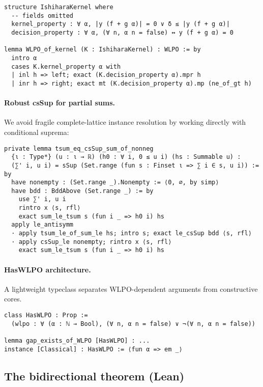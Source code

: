 \documentclass[11pt]{article}
\begin{document}
\begin{lstlisting}[caption={Ishihara kernel (illustrative Lean snippet)}]
structure IshiharaKernel where
  -- fields omitted
  kernel_property : ∀ α, |y (f + g α)| = 0 ∨ δ ≤ |y (f + g α)|
  decision_property : ∀ α, (∀ n, α n = false) ↔ y (f + g α) = 0

lemma WLPO_of_kernel (K : IshiharaKernel) : WLPO := by
  intro α
  cases K.kernel_property α with
  | inl h => left; exact (K.decision_property α).mpr h
  | inr h => right; exact mt (K.decision_property α).mp (ne_of_gt h)
\end{lstlisting}

\paragraph{Robust csSup for partial sums.}
We avoid fragile complete-lattice instance resolution by working directly with conditional suprema:
\begin{lstlisting}[caption={tsum equals csSup of finite partial sums}]
private lemma tsum_eq_csSup_sum_of_nonneg
  {ι : Type*} (u : ι → ℝ) (h0 : ∀ i, 0 ≤ u i) (hs : Summable u) :
  (∑' i, u i) = sSup (Set.range (fun s : Finset ι => ∑ i ∈ s, u i)) := by
  have nonempty : (Set.range _).Nonempty := ⟨0, ∅, by simp⟩
  have bdd : BddAbove (Set.range _) := by
    use ∑' i, u i
    rintro x ⟨s, rfl⟩
    exact sum_le_tsum s (fun i _ => h0 i) hs
  apply le_antisymm
  · apply tsum_le_of_sum_le hs; intro s; exact le_csSup bdd ⟨s, rfl⟩
  · apply csSup_le nonempty; rintro x ⟨s, rfl⟩
    exact sum_le_tsum s (fun i _ => h0 i) hs
\end{lstlisting}

\paragraph{HasWLPO architecture.}
A lightweight typeclass separates WLPO-dependent arguments from constructive cores.

\begin{lstlisting}[caption={WLPO typeclass sketch}]
class HasWLPO : Prop :=
  (wlpo : ∀ (α : ℕ → Bool), (∀ n, α n = false) ∨ ¬(∀ n, α n = false))

lemma gap_exists_of_WLPO [HasWLPO] : ...
instance [Classical] : HasWLPO := ⟨fun α => em _⟩
\end{lstlisting}

\subsection{The bidirectional theorem (Lean)}
\end{document}
